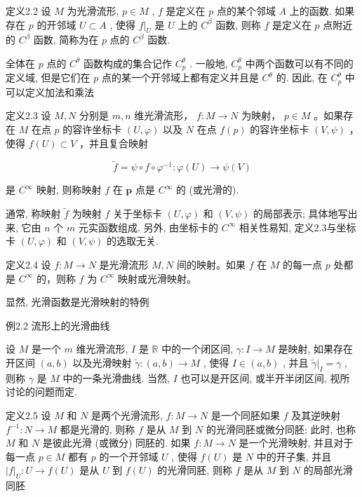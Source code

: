 定义2.2 设  $M$  为光滑流形,  $p \in M$ ,  $f$  是定义在  $p$  点的某个邻域  $A$  上的函数. 如果存在  $p$  的开邻域  $U \subset A$ , 使得  $f|_{U}$  是  $U$  上的  $C^{\beta}$  函数, 则称  $f$  是定义在  $p$  点附近的  $C^{\beta}$  函数, 简称为在  $p$  点的  $C^{\beta}$  函数.

全体在  $p$  点的  $C^{\theta}$  函数构成的集合记作  $C_p^\theta$ . 一般地,  $C_p^\theta$  中两个函数可以有不同的定义域, 但是它们在  $p$  点的某一个开邻域上都有定义并且是  $C^{\theta}$  的. 因此, 在  $C_p^\theta$  中可以定义加法和乘法

定义2.3 设  $M, N$  分别是  $m, n$  维光滑流形， $f: M \to N$  为映射， $p \in M$ 。如果存在  $M$  在点  $p$  的容许坐标卡  $(U, \varphi)$  以及  $N$  在点  $f(p)$  的容许坐标卡  $(V, \psi)$ ，使得  $f(U) \subset V$ ，并且复合映射

$$
\tilde {f} = \psi \circ f \circ \varphi^ {- 1}: \varphi (U) \rightarrow \psi (V)
$$

是  $C^\infty$  映射, 则称映射  $f$  在  $\pmb{p}$  点是  $C^\infty$  的 (或光滑的).

通常, 称映射  $\tilde{f}$  为映射  $f$  关于坐标卡  $(U, \varphi)$  和  $(V, \psi)$  的局部表示; 具体地写出来, 它由  $n$  个  $m$  元实函数组成. 另外, 由坐标卡的  $C^\infty$  相关性易知, 定义2.3与坐标卡  $(U, \varphi)$  和  $(V, \psi)$  的选取无关.

定义2.4 设  $f: M \to N$  是光滑流形  $M, N$  间的映射。如果  $f$  在  $M$  的每一点  $p$  处都是  $C^\infty$  的，则称  $f$  为  $C^\infty$  映射或光滑映射。

显然, 光滑函数是光滑映射的特例

例2.2 流形上的光滑曲线

设  $M$  是一个  $m$  维光滑流形,  $I$  是  $\mathbb{R}$  中的一个闭区间,  $\gamma: I \to M$  是映射, 如果存在开区间  $(a, b)$  以及光滑映射  $\tilde{\gamma}: (a, b) \to M$ , 使得  $I \in (a, b)$ , 并且  $\tilde{\gamma}|_{I} = \gamma$ , 则称  $\gamma$  是  $M$  中的一条光滑曲线. 当然,  $I$  也可以是开区间, 或半开半闭区间, 视所讨论的问题而定.

定义2.5 设  $M$  和  $N$  是两个光滑流形,  $f: M \to N$  是一个同胚如果  $f$  及其逆映射  $f^{-1}: N \to M$  都是光滑的, 则称  $f$  是从  $M$  到  $N$  的光滑同胚或微分同胚; 此时, 也称  $M$  和  $N$  是彼此光滑 (或微分) 同胚的. 如果  $f: M \to N$  是一个光滑映射, 并且对于每一点  $p \in M$  都有  $p$  的一个开邻域  $U$ , 使得  $f(U)$  是  $N$  中的开子集, 并且  $|f|_U: U \to f(U)$  是从  $U$  到  $f(U)$  的光滑同胚, 则称  $f$  是从  $M$  到  $N$  的局部光滑同胚

